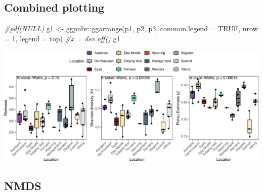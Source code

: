 \documentclass[
]{book}
\newenvironment{Shaded}{\begin{snugshade}}{\end{snugshade}}
\newcommand{\AttributeTok}[1]{\textcolor[rgb]{0.77,0.63,0.00}{#1}}
\newcommand{\CommentTok}[1]{\textcolor[rgb]{0.56,0.35,0.01}{\textit{#1}}}
\newcommand{\ConstantTok}[1]{\textcolor[rgb]{0.00,0.00,0.00}{#1}}
\newcommand{\DecValTok}[1]{\textcolor[rgb]{0.00,0.00,0.81}{#1}}
\newcommand{\FunctionTok}[1]{\textcolor[rgb]{0.00,0.00,0.00}{#1}}
\newcommand{\NormalTok}[1]{#1}
\newcommand{\OtherTok}[1]{\textcolor[rgb]{0.56,0.35,0.01}{#1}}
\newcommand{\SpecialCharTok}[1]{\textcolor[rgb]{0.00,0.00,0.00}{#1}}
\newcommand{\StringTok}[1]{\textcolor[rgb]{0.31,0.60,0.02}{#1}}
\begin{document}
\hypertarget{combined-plotting}{%
\subsection{Combined plotting}\label{combined-plotting}}

\begin{Shaded}
\begin{Highlighting}[]
\CommentTok{\#pdf(NULL)}
\NormalTok{g1 }\OtherTok{\textless{}{-}}\NormalTok{ ggpubr}\SpecialCharTok{::}\FunctionTok{ggarrange}\NormalTok{(p1, p2, p3, }\AttributeTok{common.legend =} \ConstantTok{TRUE}\NormalTok{, }\AttributeTok{nrow =} \DecValTok{1}\NormalTok{, }\AttributeTok{legend =} \StringTok{\textquotesingle{}top\textquotesingle{}}\NormalTok{)}
\CommentTok{\#x = dev.off()}
\NormalTok{g1}
\end{Highlighting}
\end{Shaded}

\includegraphics{gitbook-demo_files/figure-latex/plot-1.pdf}

\hfill\break

\hypertarget{nmds}{%
\subsection{NMDS}\label{nmds}}
\end{document}
